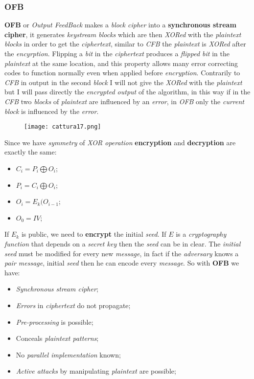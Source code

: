 \documentclass{article}
\begin{document}
\subsubsection{OFB}
\textbf{OFB} or \emph{Output FeedBack} makes a \emph{block cipher} into a \textbf{synchronous stream cipher}, it generates \emph{keystream blocks} which are then \emph{XORed} with the \emph{plaintext blocks }in order to get the \emph{ciphertext}, similar to \emph{CFB} the \emph{plaintext} is \emph{XORed} after the \emph{encyrption}. Flipping a \emph{bit} in the \emph{ciphertext} produces a \emph{flipped bit} in the \emph{plaintext} at the same location, and this property allows many error correcting codes to function normally even when applied before \emph{encryption}. Contrarily to \emph{CFB} in output in the second \emph{block} I will not give the \emph{XORed} with the \emph{plaintext} but I will pass directly the \emph{encrypted output} of the algorithm, in this way if in the \emph{CFB} two \emph{blocks} of \emph{plaintext} are influenced by an \emph{error}, in \emph{OFB} only the \emph{current block} is influenced by the \emph{error}. 
\begin{figure}[H]
  \centering
  \texttt{[image: cattura17.png]}
\end{figure}
Since we have \emph{symmetry} of \emph{XOR operation} \textbf{encryption} and \textbf{decryption} are exactly the same:
\begin{itemize}
\item $C_i = P_i \bigoplus O_i$;
\item $P_i = C_i \bigoplus O_i$;
\item $O_i = E_k(O_{i-1}$;
\item $O_0 = IV$;
\end{itemize}
If $E_k$ is public, we need to \textbf{encrypt} the initial \emph{seed}. If $E$ is a \emph{cryptography function} that depends on a \emph{secret key} then the \emph{seed} can be in clear. The \emph{initial seed} must be modified for every new \emph{message}, in fact if the \emph{adversary} knows a \emph{pair message}, initial \emph{seed} then he can encode every \emph{message}. So with \textbf{OFB} we have:
\begin{itemize}
\item \emph{Synchronous stream cipher};
\item \emph{Errors} in \emph{ciphertext} do not propagate;
\item \emph{Pre-processing} is possible;
\item Conceals \emph{plaintext patterns};
\item No \emph{parallel implementation} known;
\item \emph{Active attacks} by manipulating \emph{plaintext} are possible;
\end{itemize}
\end{document}
